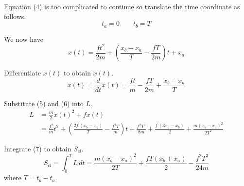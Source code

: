 \documentclass[12pt]{article}
\begin{document}
Equation (4) is too complicated to continue so translate the time coordinate as follows.
\begin{equation*}
t_a=0
\qquad
t_b=T
\end{equation*}

We now have
\begin{equation*}
x(t)=\frac{ft^2}{2m}+\left(\frac{x_b-x_a}{T}-\frac{fT}{2m}\right)t+x_a
\tag{5}
\end{equation*}

Differentiate $x(t)$ to obtain $\dot x(t)$.
\begin{equation*}
\dot x(t)=
\frac{d}{dt}x(t)=\frac{ft}{m}-\frac{fT}{2m}+\frac{x_b-x_a}{T}
\tag{6}
\end{equation*}

Substitute (5) and (6) into $L$.
\begin{align*}
L&=\frac{m}{2}\dot x(t)^2+fx(t)
\\[1ex]
&=\frac{f^2}{m}t^2
+\left(\frac{2f\,(x_b-x_a)}{T}-\frac{f^2T}{m}\right)t
+\frac{f^2T^2}{8m}
+\frac{f\,(3x_a-x_b)}{2}
+\frac{m(x_b-x_a)^2}{2T^2}
\tag{7}
\end{align*}

Integrate (7) to obtain $S_{cl}$.
\begin{equation*}
S_{cl}=\int_0^T L\,dt
=\frac{m(x_b-x_a)^2}{2T}+\frac{fT(x_b+x_a)}{2}-\frac{f^2T^3}{24m}
\tag{8}
\end{equation*}
where $T=t_b-t_a$.
\end{document}
